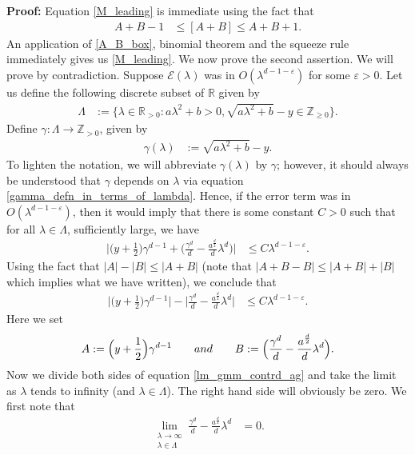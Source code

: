 \documentclass[11pt,lettersize,reqno,fullpage]{amsart}
\begin{document}
\noindent \textbf{Proof:} Equation \eqref{M_leading} is immediate using the fact that 
\begin{align} 
A+B-1&\leq [A+B]\leq A+B+1. \label{A_B_box}
\end{align}
An application of \eqref{A_B_box}, binomial theorem 
and the squeeze rule immediately gives us \eqref{M_leading}.  
We now prove the second assertion. We will prove by contradiction. Suppose 
$\mathcal{E}(\lambda)$ was in $O(\lambda^{d-1-\varepsilon})$ for some $\varepsilon>0$. 
Let us define the following discrete subset of $\mathbb{R}$ given by 
\begin{align*}
\Lambda&:= \Big\{ \lambda\in \mathbb{R}_{>0}: a \lambda^2+b>0, \sqrt{a\lambda^2+b}-y \in \mathbb{Z}_{\geq 0}
\Big\}.
\end{align*}
Define $\gamma:\Lambda\longrightarrow \mathbb{Z}_{>0}$, given by 
\begin{align} 
\gamma(\lambda)&:= \sqrt{a\lambda^2+b}-y. \label{gamma_defn_in_terms_of_lambda} 
\end{align}
To lighten the notation, 
we will abbreviate $\gamma(\lambda)$ by $\gamma$; however, it should always 
be understood that $\gamma$ depends on $\lambda$ via equation \eqref{gamma_defn_in_terms_of_lambda}. 
Hence, if the error term was in $O(\lambda^{d-1-\varepsilon})$, then it would imply that there is some constant 
$C>0$ such that for all $\lambda \in \Lambda$, sufficiently large, we have 
\begin{align}
\Big| \Big(y+\frac{1}{2}\Big) \gamma^{d-1} 
+\Big(\frac{\gamma^d}{d}-\frac{a^{\frac{d}{2}}}{d} \lambda^d\Big) \Big| & \leq C \lambda^{d-1-\varepsilon}. \label{lm_gmm_contrd}
\end{align} 
Using the fact that $|A|-|B|\leq |A+B|$
(note that $|A+B-B| \leq |A+B| + |B|$ which implies what we have written), 
we conclude that 
\begin{align}
\Big|\Big(y+\frac{1}{2}\Big) \gamma^{d-1}\Big| 
-\Big| \frac{\gamma^d}{d}-\frac{a^{\frac{d}{2}}}{d} \lambda^d \Big| 
& \leq C \lambda^{d-1-\varepsilon}. \label{lm_gmm_contrd_ag}
\end{align} 
Here we set 
\[A:= \Big(y+\frac{1}{2}\Big) \gamma^{d-1} \qquad \textnormal{and} 
\qquad B:= \Big(\frac{\gamma^d}{d}-\frac{a^{\frac{d}{2}}}{d} \lambda^d\Big). \]
Now we divide both sides of equation \eqref{lm_gmm_contrd_ag} 
and take the limit as $\lambda$ tends to infinity (and $\lambda \in \Lambda$). 
The right hand side will obviously be zero. We first note that 
\begin{align*} 
\lim_{\substack{\lambda \longrightarrow \infty\\ \lambda \in \Lambda}} 
\frac{\gamma^d}{d} - \frac{a^{\frac{d}{2}}}{d} \lambda^d & = 0. 
\end{align*}
\end{document}
